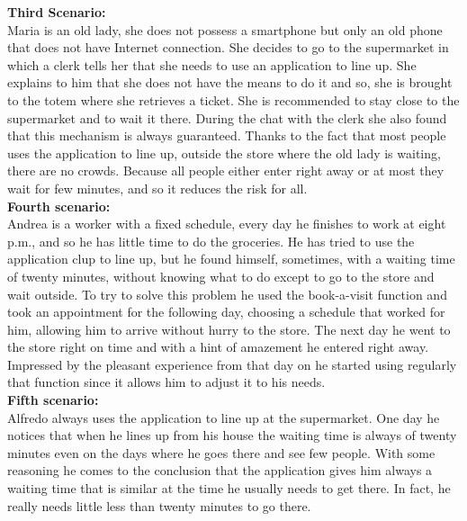 \textbf{Third Scenario:}\\
Maria is an old lady, she does not possess a smartphone but only an old phone that does not have Internet connection.
She decides to go to the supermarket in which a clerk tells her that she needs to use an application to line up. She explains to him that she does not have the means to do it and so, she is brought to the totem where she retrieves a ticket. She is recommended to stay close to the supermarket and to wait it there. During the chat with the clerk she also found that this mechanism is always guaranteed. 
Thanks to the fact that most people uses the application to line up, outside the store where the old lady is waiting, there are no crowds. Because all people either enter right away or at most they wait for few minutes, and so it reduces the risk for all.\\

\textbf{Fourth scenario:}\\
Andrea is a worker with a fixed schedule, every day he finishes to work at eight p.m., and so he has little time to do the groceries. He has tried to use the application \gls{clup} to line up, but he found himself, sometimes, with a waiting time of twenty minutes, without knowing what to do except to go to the store and wait outside. To try to solve this problem he used the book-a-visit function and took an appointment for the following day, choosing a schedule that worked for him, allowing him to arrive without hurry to the store. The next day he went to the store right on time and with a hint of amazement he entered right away. Impressed by the pleasant experience from that day on he started using regularly that function since it allows him to adjust it to his needs.\\


\textbf{Fifth scenario:}\\
Alfredo always uses the application to line up at the supermarket. One day he notices that when he lines up from his house the waiting time is always of twenty minutes even on the days where he goes there and see few people. With some reasoning he comes to the conclusion that the application gives him always a waiting time that is similar at the time he usually needs to get there. In fact, he really needs little less than twenty minutes to go there.\\



